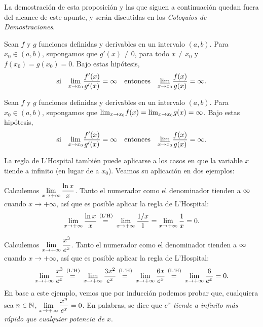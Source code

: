 La demostración de esta proposición y las que siguen a continuación quedan fuera del alcance de este apunte, y serán discutidas en los \emph{Coloquios de Demostraciones}.

\begin{proposition}
    Sean $f$ y $g$ funciones definidas y derivables en un intervalo $(a,b)$.
    Para $x_0\in(a,b)$, supongamos que $g'(x)\neq 0$, para todo $x\neq x_0$ y $f(x_0)=g(x_0)=0$.
    Bajo estas hipótesis,
    \[
    \text{si}\quad \displaystyle{\ensuremath{\lim_{x\to x_0}}} \frac{f'(x)}{g'(x)}=\infty
    \quad\text{entonces}\quad
    \displaystyle{\ensuremath{\lim_{x\to x_0}}} \frac{f(x)}{g(x)}=\infty.
    \]
\end{proposition}

\begin{proposition}
    Sean $f$ y $g$ funciones definidas y derivables en un intervalo $(a,b)$.
    Para $x_0\in(a,b)$, supongamos que ${\lim_{x\to x_0}} f(x)={\lim_{x\to x_0}} g(x)=\infty$.
    Bajo estas hipótesis, 
    \[
    \text{si}\quad \displaystyle{\ensuremath{\lim_{x\to x_0}}} \frac{f'(x)}{g'(x)}=\infty
    \quad\text{entonces}\quad
    \displaystyle{\ensuremath{\lim_{x\to x_0}}} \frac{f(x)}{g(x)}=\infty.
    \]
\end{proposition}

La regla de L'Hospital también puede aplicarse a los casos en que la variable $x$ tiende a infinito (en lugar de a $x_0$). Veamos su aplicación en dos ejemplos:

\begin{example}
    Calculemos $\displaystyle\lim_{x\to+\infty} \frac{\ln x}x$. Tanto el numerador como el denominador tienden a $\infty$ cuando $x\to+\infty$, así que es posible aplicar la regla de L'Hospital:
    \[
        \lim_{x\to+\infty} \frac{\ln x}x 
        \eqLH \lim_{x\to+\infty} \frac{1/x}1 
        = \lim_{x\to+\infty} \frac1x = 0.
    \]
\end{example}

\begin{example}
    Calculemos $\displaystyle\lim_{x\to+\infty} \frac{x^3}{e^x}$. Tanto el numerador como el denominador tienden a $\infty$ cuando $x\to+\infty$, así que es posible aplicar la regla de L'Hospital:
    \[
        \lim_{x\to+\infty} \frac{x^3}{e^x}
        \eqLH
        \lim_{x\to+\infty} \frac{3x^2}{e^x}
        \eqLH
        \lim_{x\to+\infty} \frac{6x}{e^x}
        \eqLH
        \lim_{x\to+\infty} \frac{6}{e^x}
        = 0.
    \]
    En base a este ejemplo, vemos que por inducción podemos probar que,
    cualquiera sea $n\in\mathbb{N}$,
    $\displaystyle\lim_{x\to+\infty} \frac{x^n}{e^x}=0$. En palabras, se dice que $e^x$ \emph{tiende a infinito más rápido que cualquier potencia de $x$}.
\end{example}


